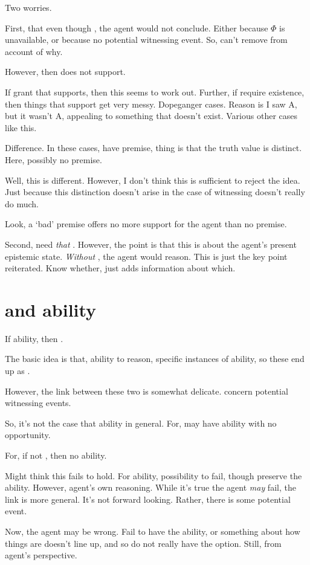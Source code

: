 \begin{note}
  Two worries.

  First, that even though , the agent would not conclude.
  Either because \(\Phi\) is unavailable, or because no potential witnessing event.
  So, can't remove  from account of why.

  However, then  does not support.

  If grant that  supports, then this seems to work out.
  Further, if require existence, then things that support get very messy.
  Dopeganger cases.
  Reason is I saw A, but it wasn't A, appealing to something that doesn't exist.
  Various other cases like this.

  Difference.
  In these cases, have premise, thing is that the truth value is distinct.
  Here, possibly no premise.

  Well, this is different.
  However, I don't think this is sufficient to reject the idea.
  Just because this distinction doesn't arise in the case of witnessing doesn't really do much.

  Look, a `bad' premise offers no more support for the agent than no premise.

  Second, need \emph{that} .
  However, the point is that this is about the agent's present epistemic state.
  \emph{Without} , the agent would reason.
  This is just the key point reiterated.
  Know whether,  just adds information about which.
\end{note}


\section{ and ability}
\label{sec:fc3-ability}

\begin{note}
  If \abgen{} ability, then .

  The basic idea is that, \abgen{} ability to reason, specific instances of \abgen{} ability, so these end up as .

  However, the link between these two is somewhat delicate.
   concern potential witnessing events.

  So, it's not the case that ability in general.
  For, may have ability with no opportunity.

  For, if not \fc{}, then no ability.

  Might think this fails to hold.
  For ability, possibility to fail, though preserve the ability.
  However, agent's own reasoning.
  While it's true the agent \emph{may} fail, the link is more general.
  It's not forward looking.
  Rather, there is some potential event.

  Now, the agent may be wrong.
  Fail to have the ability, or something about how things are doesn't line up, and so do not really have the option.
  Still, from agent's perspective.
\end{note}


